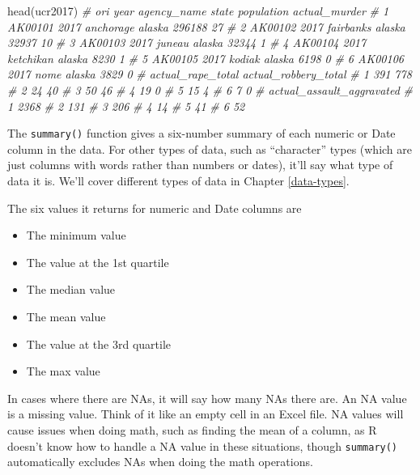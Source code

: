 \documentclass[
]{krantz}
\makeatletter
\newenvironment{Shaded}{\begin{snugshade}}{\end{snugshade}}
\newcommand{\CommentTok}[1]{\textcolor[rgb]{0.37,0.37,0.37}{\textit{#1}}}
\newcommand{\FunctionTok}[1]{\textcolor[rgb]{0,0,0}{#1}}
\newcommand{\NormalTok}[1]{#1}
\providecommand{\tightlist}{%
  \setlength{\itemsep}{0pt}\setlength{\parskip}{0pt}}
\newenvironment{kframe}{%
\medskip{}
\setlength{\fboxsep}{.8em}
 \def\at@end@of@kframe{}%
 \ifinner\ifhmode%
  \def\at@end@of@kframe{\end{minipage}}%
  \begin{minipage}{\columnwidth}%
 \fi\fi%
 \def\FrameCommand##1{\hskip\@totalleftmargin \hskip-\fboxsep
 \colorbox{shadecolor}{##1}\hskip-\fboxsep
     \hskip-\linewidth \hskip-\@totalleftmargin \hskip\columnwidth}%
 \MakeFramed {\advance\hsize-\width
   \@totalleftmargin\z@ \linewidth\hsize
   \@setminipage}}%
 {\par\unskip\endMakeFramed%
 \at@end@of@kframe}
\renewenvironment{Shaded}{\begin{kframe}}{\end{kframe}}
\makeatother
\begin{document}
\begin{Shaded}
\begin{Highlighting}[]
\FunctionTok{head}\NormalTok{(ucr2017)}
\CommentTok{\#       ori year agency\_name  state population actual\_murder}
\CommentTok{\# 1 AK00101 2017   anchorage alaska     296188            27}
\CommentTok{\# 2 AK00102 2017   fairbanks alaska      32937            10}
\CommentTok{\# 3 AK00103 2017      juneau alaska      32344             1}
\CommentTok{\# 4 AK00104 2017   ketchikan alaska       8230             1}
\CommentTok{\# 5 AK00105 2017      kodiak alaska       6198             0}
\CommentTok{\# 6 AK00106 2017        nome alaska       3829             0}
\CommentTok{\#   actual\_rape\_total actual\_robbery\_total}
\CommentTok{\# 1               391                  778}
\CommentTok{\# 2                24                   40}
\CommentTok{\# 3                50                   46}
\CommentTok{\# 4                19                    0}
\CommentTok{\# 5                15                    4}
\CommentTok{\# 6                 7                    0}
\CommentTok{\#   actual\_assault\_aggravated}
\CommentTok{\# 1                      2368}
\CommentTok{\# 2                       131}
\CommentTok{\# 3                       206}
\CommentTok{\# 4                        14}
\CommentTok{\# 5                        41}
\CommentTok{\# 6                        52}
\end{Highlighting}
\end{Shaded}

The \texttt{summary()} function gives a six-number summary
of each numeric or Date column in the data. For other types
of data, such as ``character'' types (which are just columns
with words rather than numbers or dates), it'll say what
type of data it is. We'll cover different types of data in
Chapter \ref{data-types}.

The six values it returns for numeric and Date columns are

\begin{itemize}
\tightlist
\item
  The minimum value
\item
  The value at the 1st quartile
\item
  The median value
\item
  The mean value
\item
  The value at the 3rd quartile
\item
  The max value
\end{itemize}

In cases where there are NAs, it will say how many NAs there
are. An NA value is a missing value. Think of it like an
empty cell in an Excel file. NA values will cause issues
when doing math, such as finding the mean of a column, as R
doesn't know how to handle a NA value in these situations,
though \texttt{summary()} automatically excludes NAs when
doing the math operations.
\end{document}

